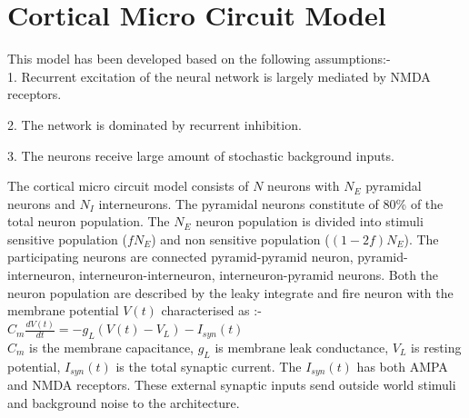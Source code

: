 \section*{Cortical Micro Circuit Model}

This model has been developed based on the following assumptions:-\\

1. Recurrent excitation of the neural network is largely mediated by NMDA receptors.

2. The network is dominated by recurrent inhibition.

3. The neurons receive large amount of stochastic background inputs.

The cortical micro circuit model consists of $N$ neurons with $N_{E}$ pyramidal neurons and $N_{I}$ interneurons. The pyramidal neurons constitute of 80\% of the total neuron population. The $N_{E}$ neuron population is divided into stimuli sensitive population ($fN_{E}$) and non sensitive population ($(1 - 2f)N_{E}$). The participating neurons are connected pyramid-pyramid neuron, pyramid- interneuron, interneuron-interneuron, interneuron-pyramid neurons. Both the neuron population are described by the leaky integrate and fire neuron with the membrane potential $ V(t)$ characterised as :-\\

\indent $C_{m} \frac{dV(t)}{dt} = -g_{L}(V(t) - V_{L}) - I_{syn}(t)$ \\

$C_{m}$ is the membrane capacitance, $g_{L}$ is membrane leak conductance, $V_{L}$ is resting potential, $I_{syn}(t)$ is the total synaptic current.  The $I_{syn} (t)$ has both AMPA and NMDA receptors. These external synaptic inputs send outside world stimuli and background noise to the architecture. 

